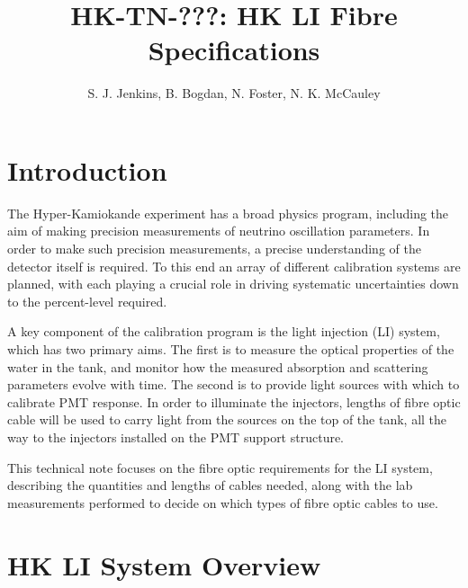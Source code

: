 \documentclass[a4paper,11pt]{article}
\begin{document}
\title{\huge{HK-TN-???: HK LI Fibre Specifications}}
\author{S. J. Jenkins, B. Bogdan, N. Foster, N. K. McCauley}

\maketitle

\tableofcontents

\newpage

\section{Introduction}\label{sec:intro}
The Hyper-Kamiokande experiment has a broad physics program, including the aim of making precision measurements of neutrino oscillation parameters. In order to make such precision measurements, a precise understanding of the detector itself is required. To this end an array of different calibration systems are planned, with each playing a crucial role in driving systematic uncertainties down to the percent-level required.

A key component of the calibration program is the light injection (LI) system, which has two primary aims. The first is to measure the optical properties of the water in the tank, and monitor how the measured absorption and scattering parameters evolve with time. The second is to provide light sources with which to calibrate PMT response. In order to illuminate the injectors, lengths of fibre optic cable will be used to carry light from the sources on the top of the tank, all the way to the injectors installed on the PMT support structure.

This technical note focuses on the fibre optic requirements for the LI system, describing the quantities and lengths of cables needed, along with the lab measurements performed to decide on which types of fibre optic cables to use.

\section{HK LI System Overview}\label{sec:overview}
\end{document}
